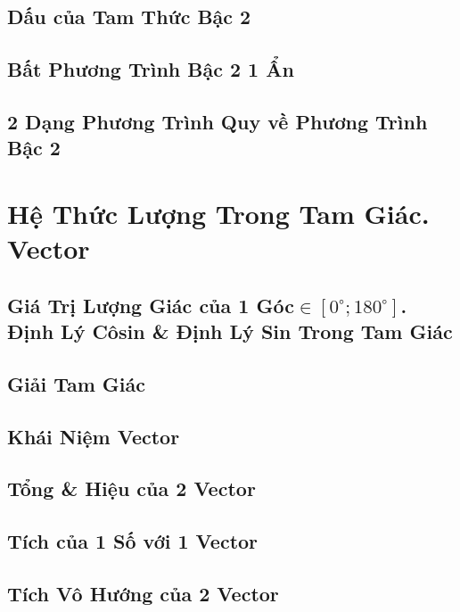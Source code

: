 \documentclass[oneside]{book}
\numberwithin{equation}{section}
\begin{document}
\section{Dấu của Tam Thức Bậc 2}

\section{Bất Phương Trình Bậc 2 1 Ẩn}

\section{2 Dạng Phương Trình Quy về Phương Trình Bậc 2}


\chapter{Hệ Thức Lượng Trong Tam Giác. Vector}

\section{Giá Trị Lượng Giác của 1 Góc$\in[0^\circ;180^\circ]$. Định Lý Côsin \& Định Lý Sin Trong Tam Giác}

\section{Giải Tam Giác}

\section{Khái Niệm Vector}

\section{Tổng \& Hiệu của 2 Vector}

\section{Tích của 1 Số với 1 Vector}

\section{Tích Vô Hướng của 2 Vector}

\end{document}
